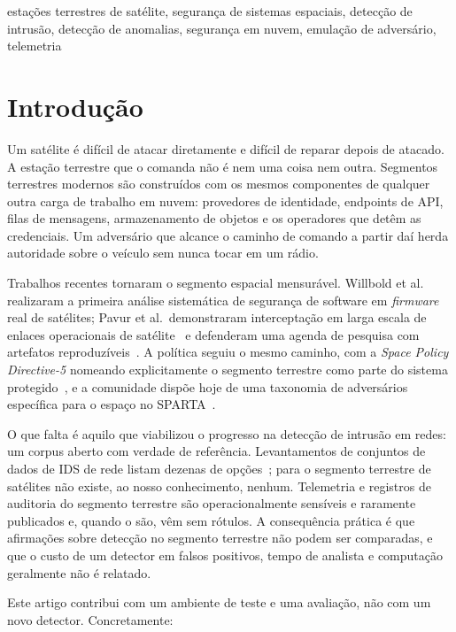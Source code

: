 \documentclass[conference]{IEEEtran}
\begin{document}
\begin{IEEEkeywords}
estações terrestres de satélite, segurança de sistemas espaciais, detecção de
intrusão, detecção de anomalias, segurança em nuvem, emulação de adversário,
telemetria
\end{IEEEkeywords}

\section{Introdução}

Um satélite é difícil de atacar diretamente e difícil de reparar depois de
atacado. A estação terrestre que o comanda não é nem uma coisa nem outra.
Segmentos terrestres modernos são construídos com os mesmos componentes de
qualquer outra carga de trabalho em nuvem: provedores de identidade, endpoints
de API, filas de mensagens, armazenamento de objetos e os operadores que detêm
as credenciais. Um adversário que alcance o caminho de comando a partir daí
herda autoridade sobre o veículo sem nunca tocar em um rádio.

Trabalhos recentes tornaram o segmento espacial mensurável. Willbold et
al.~\cite{willbold2023space} realizaram a primeira análise sistemática de
segurança de software em \emph{firmware} real de satélites; Pavur et al.\
demonstraram interceptação em larga escala de enlaces operacionais de
satélite~\cite{pavur2020vsat} e defenderam uma agenda de pesquisa com artefatos
reproduzíveis~\cite{pavur2020sok}. A política seguiu o mesmo caminho, com a
\emph{Space Policy Directive-5} nomeando explicitamente o segmento terrestre
como parte do sistema protegido~\cite{spd5}, e a comunidade dispõe hoje de uma
taxonomia de adversários específica para o espaço no SPARTA~\cite{sparta}.

O que falta é aquilo que viabilizou o progresso na detecção de intrusão em
redes: um corpus aberto com verdade de referência. Levantamentos de conjuntos de
dados de IDS de rede listam dezenas de opções~\cite{ring2019datasets}; para o
segmento terrestre de satélites não existe, ao nosso conhecimento, nenhum.
Telemetria e registros de auditoria do segmento terrestre são
operacionalmente sensíveis e raramente publicados e, quando o são, vêm sem
rótulos. A consequência prática é que afirmações sobre detecção no segmento
terrestre não podem ser comparadas, e que o custo de um detector em falsos
positivos, tempo de analista e computação geralmente não é relatado.

Este artigo contribui com um ambiente de teste e uma avaliação, não com um novo
detector. Concretamente:
\end{document}
